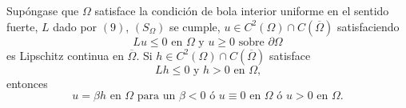 



\begin{theorem}
Sup\'{o}ngase que $\Omega$ satisface la condici\'{o}n de bola interior
uniforme en el sentido fuerte, $L$ dado por $\left(  9\right)  $, $\left(
S_{\Omega}\right)  $ se cumple, $u\in C^{2}\left(  \Omega\right)  \cap
C\left(  \overline{\Omega}\right)  $ satisfaciendo
\[
Lu\leq0\text{ \ en }\Omega\text{ \ y }u\geq0\text{ \ sobre }\partial\Omega
\]
es Lipschitz continua en $\overline{\Omega}$. Si $h\in C^{2}\left(
\Omega\right)  \cap C\left(  \overline{\Omega}\right)  $ satisface
\[
Lh\leq0\text{ \ y \ }h>0\text{ en }\Omega\text{,}%
\]
entonces
\[
u=\beta h\text{ \ en }\Omega\text{ para un }\beta<0\text{ \ \'{o} \ }%
u\equiv0\text{ \ en }\Omega\text{ \ \'{o} }u>0\text{ \ en }\Omega\text{.}%
\]

\end{theorem}
